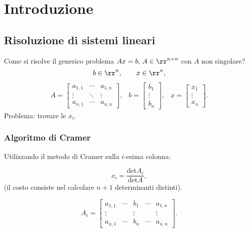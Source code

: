 
\chapter*{Introduzione}
\section*{Risoluzione di sistemi lineari}

Come si risolve il generico problema $Ax = b, \,   A \in \rr^{n \times n}$ con
$A$ non singolare?
\[
b \in \rr^n, \qquad
x \in \rr^n,
\]
\[
\begin{array}{ccc}
A = \left [\begin{array}{ccc}
a_{1,1} & \cdots & a_{1,n} \\
\vdots & \ddots & \vdots \\
a_{n,1} & \cdots & a_{n,n}
\end{array}
\right],
&
b = \left[ \begin{array}{c}
b_{1} \\
\vdots \\
b_{n}
\end{array}\right],
&
x = \left [\begin{array}{c}
x_{1} \\
\vdots \\
x_{n}
\end{array}\right].
\end{array}
\]
Problema: trovare le $x_i$.
\subsection*{Algoritmo di Cramer}
Utilizzando il metodo di Cramer sulla $i$-esima colonna:

\[x_i = \frac{\textrm{det}A_i}{\textrm{det}A},\]
(il costo consiste nel calcolare $n+1$ determinanti
distinti).

\[
A_i = \left[ \begin{array}{ccccc}
a_{1,1} & \cdots & b_1 & \cdots & a_{1,n} \\
\vdots & & \vdots & & \vdots \\
a_{n,1} & \cdots & b_n & \cdots & a_{n,n}
\end{array} \right].
\]

